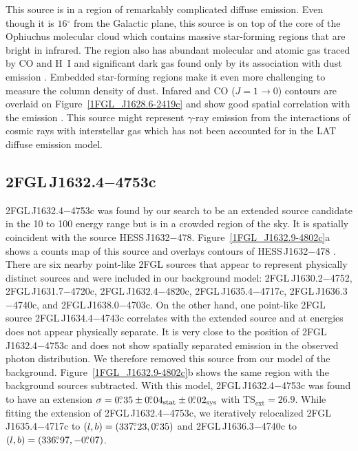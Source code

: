 \documentclass[12pt,preprint]{aastex}
\newcommand{\gev}{\text{GeV}\xspace}
\newcommand{\tev}{\text{TeV}\xspace}
\newcommand{\tsext}{{\ensuremath{\text{TS}_{\text{ext}}}}\xspace}
\newcommand{\sys}{\text{sys}\xspace}
\newcommand{\stat}{\text{stat}\xspace}
\newcommand{\degree}{\ensuremath{^\circ}\xspace}
\begin{document}
This source is in a region of remarkably complicated diffuse emission.
Even though it is $16\degree$ from the Galactic plane, this source is on
top of the core of the Ophiuchus molecular cloud which contains massive
star-forming regions that are bright in infrared.  The region also has
abundant molecular and atomic gas traced by CO and H~I and significant 
dark gas found only by its association with dust emission
\citep{isabelle_dark_gass}. Embedded star-forming regions make it even
more challenging to measure the column density of dust.  Infared and 
CO ($J=1\rightarrow 0$)
contours are overlaid on Figure~\ref{1FGL_J1628.6-2419c} and show good
spatial correlation with the \gev emission \citep{iras_rho_ophiuci,co_rho_ophiuci}.
This source might 
represent $\gamma$-ray emission from the interactions of cosmic rays with
interstellar gas which has not been accounted for in the LAT diffuse
emission model.


\subsection{2FGL\,J1632.4$-$4753c}
\label{section_2FGL_J1632.4-4753c}




2FGL\,J1632.4$-$4753c was found by our search to be an extended source
candidate in the 10 \gev to 100 \gev energy range but is in a crowded
region of the sky.  It is spatially coincident with the \tev source
HESS\,J1632$-$478.  Figure~\ref{1FGL_J1632.9-4802c}a shows a counts
map of this source and overlays \tev contours of HESS\,J1632$-$478
\citep{hess_plane_survey}.  There are six nearby point-like 2FGL
sources that appear to represent physically distinct sources
and were included in our background model: 2FGL\,J1630.2$-$4752, 2FGL\,J1631.7$-$4720c, 2FGL\,J1632.4$-$4820c, 2FGL\,J1635.4$-$4717c,
2FGL\,J1636.3$-$4740c, and
2FGL\,J1638.0$-$4703c. On the
other hand, one point-like 2FGL source 2FGL\,J1634.4$-$4743c  correlates
with the extended \tev source and at \gev energies does
not appear physically separate. 
It is very close to the position of 2FGL\,J1632.4$-$4753c
and does not show spatially separated emission in the observed photon distribution.
We therefore removed this source from our model of the
background.  Figure~\ref{1FGL_J1632.9-4802c}b shows the same region with
the background sources subtracted.  With this model, 2FGL\,J1632.4$-$4753c
was found to have an extension $\sigma=0\fdg35\pm0\fdg04_\stat\pm0\fdg02_\sys$
with $\tsext=26.9$.  While fitting the
extension of 2FGL\,J1632.4$-$4753c, we iteratively relocalized
2FGL\,J1635.4$-$4717c to $(l,b)=(337\mbox{$.\!\!^\circ$}23,0\mbox{$.\!\!^\circ$}35)$ and
2FGL\,J1636.3$-$4740c to $(l,b)=(336\mbox{$.\!\!^\circ$}97,-0\mbox{$.\!\!^\circ$}07)$.
\end{document}
